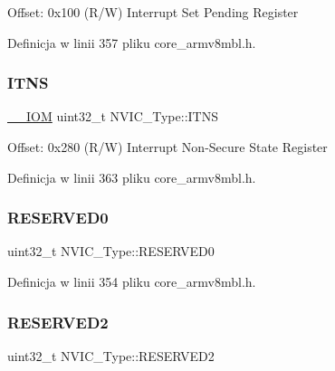 Offset\+: 0x100 (R/W) Interrupt Set Pending Register 

Definicja w linii 357 pliku core\+\_\+armv8mbl.\+h.

\mbox{\label{struct_n_v_i_c___type_a4940c96f11d1c95d95a28e388f04d6d6}} 
\subsubsection{\texorpdfstring{I\+T\+NS}{ITNS}}
{\footnotesize\ttfamily \hyperlink{core__sc300_8h_ab6caba5853a60a17e8e04499b52bf691}{\+\_\+\+\_\+\+I\+OM} uint32\+\_\+t N\+V\+I\+C\+\_\+\+Type\+::\+I\+T\+NS}

Offset\+: 0x280 (R/W) Interrupt Non-\/\+Secure State Register 

Definicja w linii 363 pliku core\+\_\+armv8mbl.\+h.

\mbox{\label{struct_n_v_i_c___type_a114b23ee6f1540603908adaedaecc477}} 
\subsubsection{\texorpdfstring{R\+E\+S\+E\+R\+V\+E\+D0}{RESERVED0}}
{\footnotesize\ttfamily uint32\+\_\+t N\+V\+I\+C\+\_\+\+Type\+::\+R\+E\+S\+E\+R\+V\+E\+D0}



Definicja w linii 354 pliku core\+\_\+armv8mbl.\+h.

\mbox{\label{struct_n_v_i_c___type_a8ed6bf06e09e4ebc57e591fde22c70c3}} 
\subsubsection{\texorpdfstring{R\+E\+S\+E\+R\+V\+E\+D2}{RESERVED2}}
{\footnotesize\ttfamily uint32\+\_\+t N\+V\+I\+C\+\_\+\+Type\+::\+R\+E\+S\+E\+R\+V\+E\+D2}



